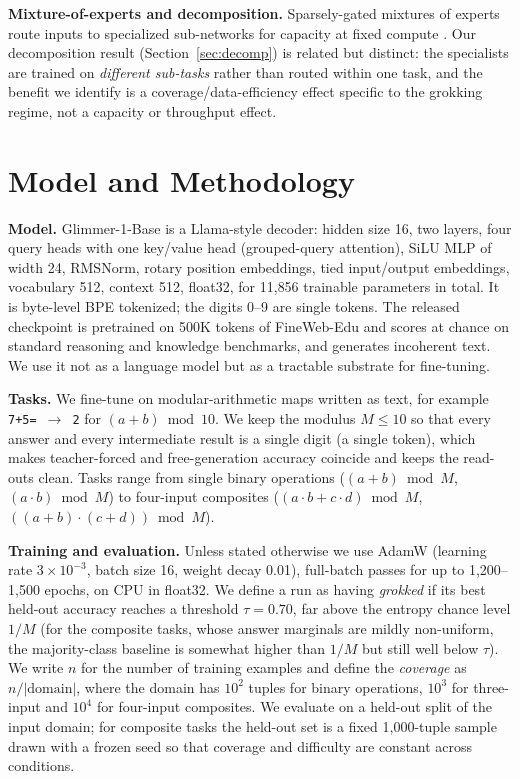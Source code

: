 \documentclass[10pt]{article} %
\begin{document}
\textbf{Mixture-of-experts and decomposition.} Sparsely-gated mixtures of experts route inputs to
specialized sub-networks for capacity at fixed compute \citep{shazeer2017moe,fedus2022switch}. Our
decomposition result (Section~\ref{sec:decomp}) is related but distinct: the specialists are
trained on \emph{different sub-tasks} rather than routed within one task, and the benefit we
identify is a coverage/data-efficiency effect specific to the grokking regime, not a capacity or
throughput effect.

\section{Model and Methodology}
\label{sec:method}

\textbf{Model.} Glimmer-1-Base is a Llama-style decoder: hidden size 16, two layers, four query
heads with one key/value head (grouped-query attention), SiLU MLP of width 24, RMSNorm, rotary
position embeddings, tied input/output embeddings, vocabulary 512, context 512, float32, for
11{,}856 trainable parameters in total. It is byte-level BPE tokenized; the digits 0--9 are single
tokens. The released checkpoint is pretrained on 500K tokens of FineWeb-Edu and scores at chance
on standard reasoning and knowledge benchmarks, and generates incoherent text. We use it not as a
language model but as a tractable substrate for fine-tuning.

\textbf{Tasks.} We fine-tune on modular-arithmetic maps written as text, for example
\texttt{7+5=}~$\rightarrow$~\texttt{2} for $(a{+}b)\bmod 10$. We keep the modulus $M \leq 10$ so
that every answer and every intermediate result is a single digit (a single token), which makes
teacher-forced and free-generation accuracy coincide and keeps the read-outs clean. Tasks range
from single binary operations ($(a{+}b)\bmod M$, $(a\cdot b)\bmod M$) to four-input composites
($(a\cdot b + c\cdot d)\bmod M$, $((a{+}b)\cdot(c{+}d))\bmod M$).

\textbf{Training and evaluation.} Unless stated otherwise we use AdamW (learning rate
$3\times10^{-3}$, batch size 16, weight decay 0.01), full-batch passes for up to 1{,}200--1{,}500
epochs, on CPU in float32. We define a run as having \emph{grokked} if its best held-out accuracy
reaches a threshold $\tau=0.70$, far above the entropy chance level $1/M$ (for the composite tasks,
whose answer marginals are mildly non-uniform, the majority-class baseline is somewhat higher than
$1/M$ but still well below $\tau$). We write $n$ for the number of training examples and define the
\emph{coverage} as $n/|\text{domain}|$, where the domain has $10^2$ tuples for binary operations,
$10^3$ for three-input and $10^4$ for four-input composites. We evaluate on a held-out split of the
input domain; for composite tasks the held-out set is a fixed 1{,}000-tuple sample drawn with a
frozen seed so that coverage and difficulty are constant across conditions.
\end{document}
